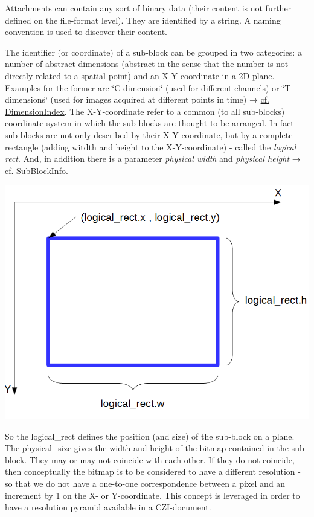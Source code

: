 Attachments can contain any sort of binary data (their content is not further defined on the file-\/format level). They are identified by a string. A naming convention is used to discover their content.

The identifier (or coordinate) of a sub-\/block can be grouped in two categories\+: a number of abstract dimensions (abstract in the sense that the number is not directly related to a spatial point) and an X-\/\+Y-\/coordinate in a 2\+D-\/plane. Examples for the former are \char`\"{}\+C-\/dimension\char`\"{} (used for different channels) or \char`\"{}\+T-\/dimensions\char`\"{} (used for images acquired at different points in time) → \hyperlink{namespacelib_c_z_i_a55049658acf59d0eddfaebcad16df424}{cf. Dimension\+Index}. The X-\/\+Y-\/coordinate refer to a common (to all sub-\/blocks) coordinate system in which the sub-\/blocks are thought to be arranged. In fact -\/ sub-\/blocks are not only described by their X-\/\+Y-\/coordinate, but by a complete rectangle (adding witdth and height to the X-\/\+Y-\/coordinate) -\/ called the {\itshape logical rect}. And, in addition there is a parameter {\itshape physical width} and {\itshape physical height} → \hyperlink{structlib_c_z_i_1_1_sub_block_info}{cf. Sub\+Block\+Info}.~\newline
 
\begin{DoxyImage}
\includegraphics[width=\textwidth,height=\textheight/2,keepaspectratio=true]{CZI_2.PNG}
\end{DoxyImage}
 So the logical\+\_\+rect defines the position (and size) of the sub-\/block on a plane. The physical\+\_\+size gives the width and height of the bitmap contained in the sub-\/block. They may or may not coincide with each other. If they do not coincide, then conceptually the bitmap is to be considered to have a different resolution -\/ so that we do not have a one-\/to-\/one correspondence between a pixel and an increment by 1 on the X-\/ or Y-\/coordinate. This concept is leveraged in order to have a resolution pyramid available in a C\+Z\+I-\/document. 